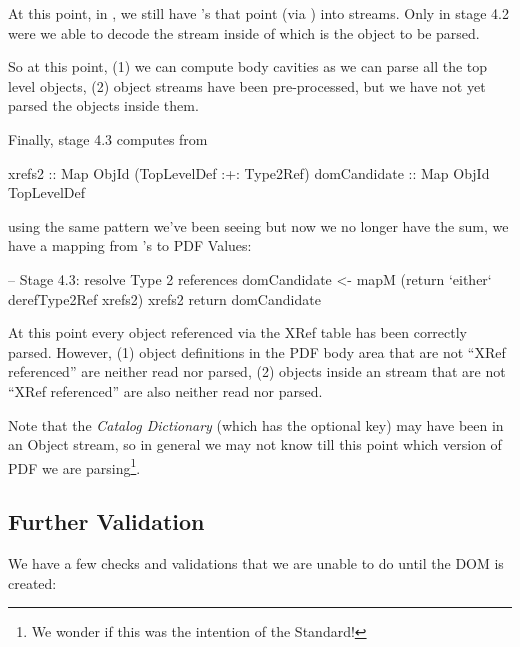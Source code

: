 At this point, in , we still have 's that point
(via ) into  streams.
Only in stage 4.2 were we able to decode the stream inside of
which is the object to be parsed.


So at this point, (1) we can compute body cavities  as
we can parse all the top level objects, (2) object streams have been
pre-processed, but we have not yet parsed the objects inside them.

Finally, stage 4.3 computes  from 
\begin{codeNoExecute}
  xrefs2       :: Map ObjId (TopLevelDef :+: Type2Ref) 
  domCandidate :: Map ObjId TopLevelDef
\end{codeNoExecute}
using the same pattern we've been seeing but now we no longer have 
the sum, we have a mapping from 's to PDF Values:
\begin{code}
    -- Stage 4.3: resolve Type 2 references
    domCandidate <- mapM
                     (return `either` derefType2Ref xrefs2)
                     xrefs2
    return domCandidate
\end{code}

At this point every object referenced via the XRef table has been
correctly parsed. However, (1) object definitions in the PDF body
area that are not ``XRef referenced'' are neither read nor parsed,
% 
(2) objects inside an  stream that are not ``XRef
referenced'' are also neither read nor parsed.

Note that the \emph{Catalog Dictionary} (which has the optional
 key) may have been in an Object stream, so in general
we may not know till this point which version of PDF we are
parsing\footnote{We wonder if this was the intention of the Standard!}.


\subsection{Further Validation}
\label{sec:validating}


We have a few checks and validations that we are unable to do until
the DOM is created:


